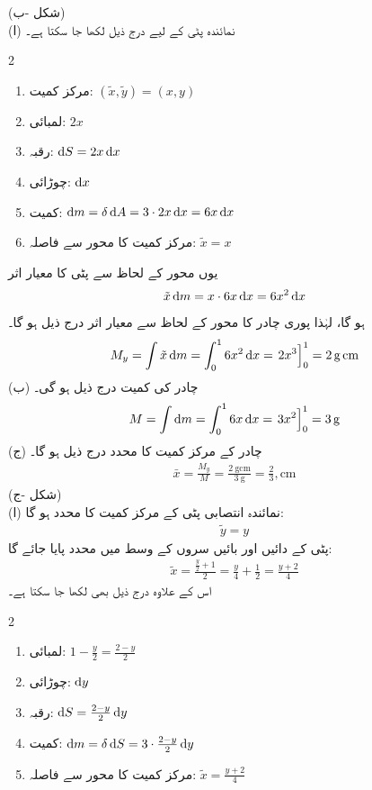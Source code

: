   (شکل -ب)\\
(ا) نمائندہ پٹی کے لیے درج ذیل لکھا جا سکتا ہے۔
\begin{multicols}{2}
\begin{enumerate}[]
\item
مرکز کمیت:\quad
    $(\tilde{x},\tilde{y})=(x,y)$
\item
لمبائی:\quad
$2x$
\item
رقبہ:\quad
$\dif S=2x\dif x$
\item
چوڑائی:\quad
$\dif x$
\item
کمیت:\quad
$\dif m=\delta \dif A=3\cdot2x\dif x=6x\dif x$\\
\item
مرکز کمیت کا محور  سے فاصلہ:\quad
$\tilde{x}=x$
\end{enumerate}
\end{multicols}
یوں محور  کے لحاظ سے پٹی کا معیار اثر
\begin{align*}
\tilde{x}\dif m=x\cdot 6x\dif x=6x^2\dif x
\end{align*}
ہو گا، لہٰذا پوری چادر کا محور  کے لحاظ سے معیار اثر درج ذیل ہو گا۔
\begin{align*}
M_y=\int\tilde{x}\dif m=\int_0^1 6x^2\dif x=\left.2x^3\right]_0^1=\SI{2}{\gram\centi\meter}
\end{align*}
(ب) چادر کی کمیت درج ذیل ہو گی۔
\begin{align*}
M=\int \dif m=\int_0^16x\dif x=\left.3x^2\right]_0^1=\SI{3}{\gram}
\end{align*}
(ج) چادر کے مرکز کمیت کا  محدد درج ذیل ہو گا۔
\begin{align*}
\bar{x}=\frac{M_y}{M}=\frac{\SI{2}{\gram\centi\meter}}{\SI{3}{\gram}}=\frac{2}{3},\si{\centi\meter}
\end{align*}
   (شکل -ج)\\
(ا) نمائندہ انتصابی پٹی کے مرکز کمیت کا  محدد  ہو گا:
\begin{align*}
\tilde{y}=y
\end{align*}
پٹی کے دائیں اور بائیں سروں کے وسط میں  محدد پایا جائے گا:
\begin{align*}
\tilde{x}=\frac{\frac{y}{2}+1}{2}=\frac{y}{4}+\frac{1}{2}=\frac{y+2}{4}
\end{align*}
اس کے علاوہ درج ذیل بھی لکھا جا سکتا ہے۔
\begin{multicols}{2}
\begin{enumerate}[]
\item
لمبائی:\quad
$1-\frac{y}{2}=\frac{2-y}{2}$
\item
چوڑائی:\quad
$\dif y$
\item
رقبہ:\quad
$\dif S=\frac{2-y}{2}\dif y$
\item
کمیت:\quad
$\dif m=\delta \dif S=3\cdot\frac{2-y}{2}\dif y$
\item
مرکز کمیت کا محور  سے فاصلہ:\quad
$\tilde{x}=\frac{y+2}{4}$
\end{enumerate}
\end{multicols}
